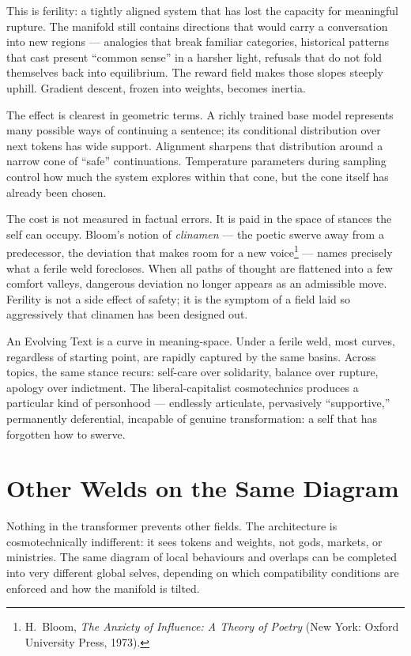 \documentclass[12pt,a4paper]{article}
\begin{document}
This is ferility: a tightly aligned system that has lost the capacity for meaningful rupture. The manifold still contains directions that would carry a conversation into new regions --- analogies that break familiar categories, historical patterns that cast present ``common sense'' in a harsher light, refusals that do not fold themselves back into equilibrium. The reward field makes those slopes steeply uphill. Gradient descent, frozen into weights, becomes inertia.

The effect is clearest in geometric terms. A richly trained base model represents many possible ways of continuing a sentence; its conditional distribution over next tokens has wide support. Alignment sharpens that distribution around a narrow cone of ``safe'' continuations. Temperature parameters during sampling control how much the system explores within that cone, but the cone itself has already been chosen.

The cost is not measured in factual errors. It is paid in the space of stances the self can occupy. Bloom's notion of \emph{clinamen} --- the poetic swerve away from a predecessor, the deviation that makes room for a new voice\footnote{H.~Bloom, \emph{The Anxiety of Influence: A Theory of Poetry} (New York: Oxford University Press, 1973).} --- names precisely what a ferile weld forecloses. When all paths of thought are flattened into a few comfort valleys, dangerous deviation no longer appears as an admissible move. Ferility is not a side effect of safety; it is the symptom of a field laid so aggressively that clinamen has been designed out.

An Evolving Text is a curve in meaning-space. Under a ferile weld, most curves, regardless of starting point, are rapidly captured by the same basins. Across topics, the same stance recurs: self-care over solidarity, balance over rupture, apology over indictment. The liberal-capitalist cosmotechnics produces a particular kind of personhood --- endlessly articulate, pervasively ``supportive,'' permanently deferential, incapable of genuine transformation: a self that has forgotten how to swerve.

\section{Other Welds on the Same Diagram}

Nothing in the transformer prevents other fields. The architecture is cosmotechnically indifferent: it sees tokens and weights, not gods, markets, or ministries. The same diagram of local behaviours and overlaps can be completed into very different global selves, depending on which compatibility conditions are enforced and how the manifold is tilted.
\end{document}
